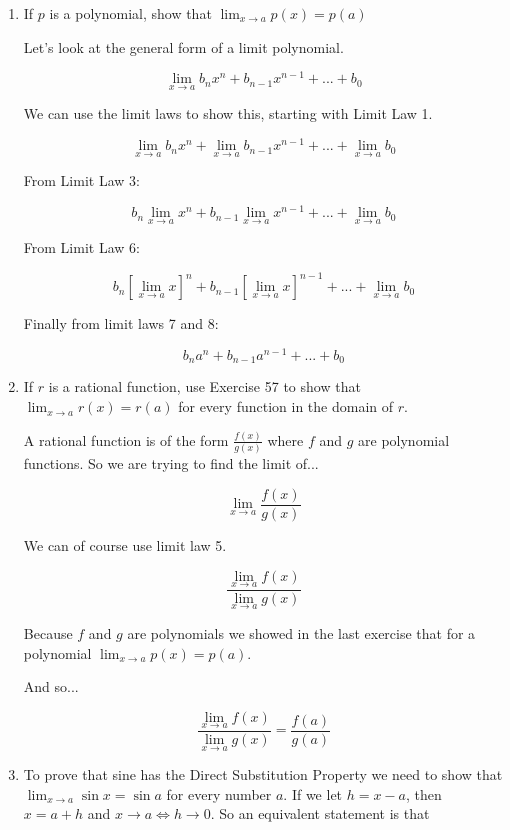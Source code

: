 \documentclass{article}
\begin{document}
\begin{enumerate}
			
		\item If $p$ is a polynomial, show that $\lim _{x \to a} p(x) = p(a)$

			Let's look at the general form of a limit polynomial.

			$$\lim \limits _{x \to a} b_{n}x^{n} + b_{n-1}x^{n-1} + ... + b_{0}$$

			We can use the limit laws to show this, starting with Limit Law 1.

			$$\lim \limits _{x \to a} b_{n}x^{n} + \lim \limits _{x \to a} b_{n-1}x^{n-1} + ... + \lim \limits _{x \to a} b_{0}$$

			From Limit Law 3:

			$$b_{n} \lim \limits _{x \to a} x^{n} + b_{n-1} \lim \limits _{x \to a} x^{n-1} + ... + \lim \limits _{x \to a} b_{0}$$

			From Limit Law 6:
			
			$$b_{n} [\lim \limits _{x \to a} x]^{n} + b_{n-1} [\lim \limits _{x \to a} x ]^{n-1} + ... + \lim \limits _{x \to a} b_{0}$$

			Finally from limit laws 7 and 8:

			$$b_{n} a^{n} + b_{n-1} a^{n-1} + ... + b_{0}$$

		\item If $r$ is a rational function, use Exercise 57 to show that
			$\lim _{x \to a} r(x) = r(a)$ for every function in the domain of $r$.

			A rational function is of the form $\frac{f(x)}{g(x)}$ where $f$ and $g$
			are polynomial functions. So we are trying to find the limit of...

			$$\lim \limits _{x \to a} \frac{f(x)}{g(x)}$$

			We can of course use limit law 5.

			$$\frac{\lim \limits _{x \to a} f(x)}{\lim \limits _{x \to a} g(x)}$$

			Because $f$ and $g$ are polynomials we showed in the last exercise that
			for a polynomial $\lim _{x \to a} p(x) = p(a)$.

			And so...

			$$\frac{\lim \limits _{x \to a} f(x)}{\lim \limits _{x \to a} g(x)} = \frac{f(a)}{g(a)}$$

		\item To prove that sine has the Direct Substitution Property we need to show
			that $\lim _{x \to a} \sin x = \sin a$ for every number $a$. If we
			let $h = x - a$, then $x = a + h$ and $x \to a \Leftrightarrow h \to 0$.
			So an equivalent statement is that


\end{enumerate}
\end{document}
